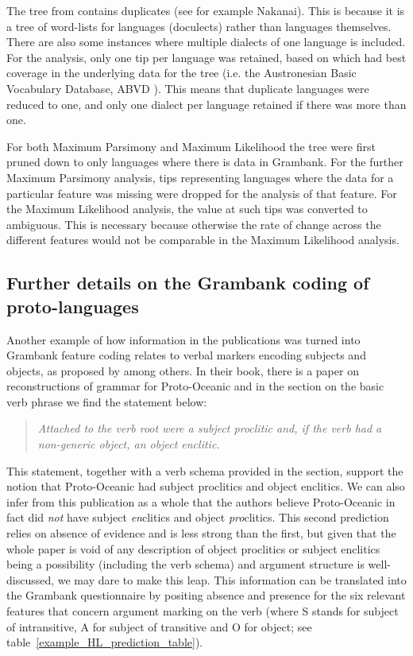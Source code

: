 \documentclass[draft,10pt]{article} %
\begin{document}
The tree from \citet{grayetal_2009} contains duplicates (see for example Nakanai). This is because it is a tree of word-lists for languages (doculects) rather than languages themselves. There are also some instances where multiple dialects of one language is included. For the analysis, only one tip per language was retained, based on which had best coverage in the underlying data for the tree (i.e. the Austronesian Basic Vocabulary Database, ABVD \citep{ABVD}). This means that duplicate languages were reduced to one, and only one dialect per language retained if there was more than one. 


For both Maximum Parsimony and Maximum Likelihood the tree were first pruned down to only languages where there is data in Grambank. For the further Maximum Parsimony analysis, tips representing languages where the data for a particular feature was missing were dropped for the analysis of that feature. For the Maximum Likelihood analysis, the value at such tips was converted to ambiguous. This is necessary because otherwise the rate of change across the different features would not be comparable in the Maximum Likelihood analysis.


\subsection{Further details on the Grambank coding of proto-languages }
\label{supp:proto_lg_coding}
Another example of how information in the publications was turned into Grambank feature coding relates to verbal markers encoding subjects and objects, as proposed by \citet{lynchrosscrowley_proto_grammar_oceanic} among others. In their book, there is a paper on reconstructions of grammar for Proto-Oceanic and in the section on the basic verb phrase we find the statement below:

\begin{quotation}
\noindent\emph{Attached to the verb root were a subject proclitic and, if the verb had a non-generic object, an object enclitic.} \end{quotation} \begin{flushright} \citet[83]{lynchrosscrowley_proto_grammar_oceanic} \end{flushright}

This statement, together with a verb schema provided in the section, support the notion that Proto-Oceanic had subject proclitics and object enclitics. We can also infer from this publication as a whole that the authors believe Proto-Oceanic in fact did \emph{not} have subject \emph{en}clitics and object \emph{pro}clitics. This second prediction relies on absence of evidence and is less strong than the first, but given that the whole paper is void of any description of object proclitics or subject enclitics being a possibility (including the verb schema) and argument structure is well-discussed, we may dare to make this leap. This information can be translated into the Grambank questionnaire by positing absence and presence for the six relevant features that concern argument marking on the verb (where S stands for subject of intransitive, A for subject of transitive and O for object; see table~\ref{example_HL_prediction_table}).
\end{document}

